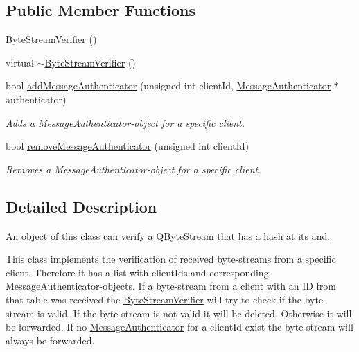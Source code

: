 \subsection*{Public Member Functions}
\begin{DoxyCompactItemize}
\item 
\hyperlink{class_server_appl_1_1_byte_stream_verifier_a9d89c354709f052e4b4addcac8fbb996}{Byte\+Stream\+Verifier} ()
\item 
virtual \hyperlink{class_server_appl_1_1_byte_stream_verifier_ae4d363ecd0f99adf76ed6409e14b234a}{$\sim$\+Byte\+Stream\+Verifier} ()
\item 
bool \hyperlink{class_server_appl_1_1_byte_stream_verifier_ab172de1f63253d8b6b7b06f85e4dce4e}{add\+Message\+Authenticator} (unsigned int client\+Id, \hyperlink{class_message_authenticator}{Message\+Authenticator} $\ast$authenticator)
\begin{DoxyCompactList}\small\item\em Adds a Message\+Authenticator-\/object for a specific client. \end{DoxyCompactList}\item 
bool \hyperlink{class_server_appl_1_1_byte_stream_verifier_a9424c37813986023dc8c6833cc984a89}{remove\+Message\+Authenticator} (unsigned int client\+Id)
\begin{DoxyCompactList}\small\item\em Removes a Message\+Authenticator-\/object for a specific client. \end{DoxyCompactList}\end{DoxyCompactItemize}


\subsection{Detailed Description}
An object of this class can verify a Q\+Byte\+Stream that has a hash at its and. 

This class implements the verification of received byte-\/streams from a specific client. Therefore it has a list with client\+Id\textquotesingle{}s and corresponding Message\+Authenticator-\/objects. If a byte-\/stream from a client with an I\+D from that table was received the \hyperlink{class_server_appl_1_1_byte_stream_verifier}{Byte\+Stream\+Verifier} will try to check if the byte-\/stream is valid. If the byte-\/stream is not valid it will be deleted. Otherwise it will be forwarded. If no \hyperlink{class_message_authenticator}{Message\+Authenticator} for a client\+Id exist the byte-\/stream will always be forwarded. 

